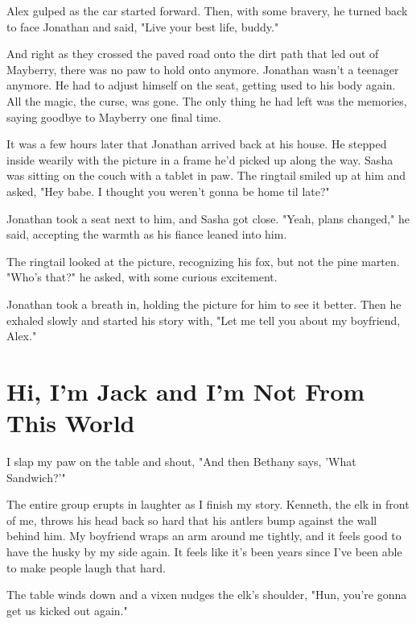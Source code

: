 Alex gulped as the car started forward. Then, with some bravery, he turned back to face Jonathan and said, "Live your best life, buddy."

And right as they crossed the paved road onto the dirt path that led out of Mayberry, there was no paw to hold onto anymore. Jonathan wasn't a teenager anymore. He had to adjust himself on the seat, getting used to his body again. All the magic, the curse, was gone. The only thing he had left was the memories, saying goodbye to Mayberry one final time.

It was a few hours later that Jonathan arrived back at his house. He stepped inside wearily with the picture in a frame he'd picked up along the way. Sasha was sitting on the couch with a tablet in paw. The ringtail smiled up at him and asked, "Hey babe. I thought you weren't gonna be home til late?"

Jonathan took a seat next to him, and Sasha got close. "Yeah, plans changed," he said, accepting the warmth as his fiance leaned into him.

The ringtail looked at the picture, recognizing his fox, but not the pine marten. "Who's that?" he asked, with some curious excitement.

Jonathan took a breath in, holding the picture for him to see it better. Then he exhaled slowly and started his story with, "Let me tell you about my boyfriend, Alex."

\cleartoverso


\chapter*{Hi, I'm Jack and I'm Not From This World}


I slap my paw on the table and shout, "And then Bethany says, 'What Sandwich?'"

The entire group erupts in laughter as I finish my story. Kenneth, the elk in front of me, throws his head back so hard that his antlers bump against the wall behind him. My boyfriend wraps an arm around me tightly, and it feels good to have the husky by my side again. It feels like it's been years since I've been able to make people laugh that hard.

The table winds down and a vixen nudges the elk's shoulder, "Hun, you're gonna get us kicked out again."

